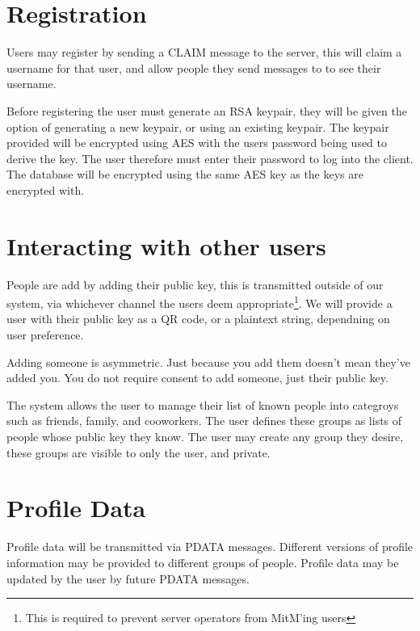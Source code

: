
\section{Registration}
Users may register by sending a CLAIM message to the server, this will claim a
username for that user, and allow people they send messages to to see their
username.

Before registering the user must generate an RSA keypair, they will be given the
option of generating a new keypair, or using an existing keypair. The keypair
provided will be encrypted using AES with the users password being used to
derive the key. The user therefore must enter their password to log into the
client. The database will be encrypted using the same AES key as the keys are
encrypted with.

\section{Interacting with other users}
People are add by adding their public key, this is transmitted outside of our
system, via whichever channel the users deem appropriate\footnote{This is
required to prevent server operators from MitM'ing users}. We will provide a
user with their public key as a QR code, or a plaintext string, dependning on
user preference.

Adding someone is asymmetric. Just because you add them doesn't mean they've
added you. You do not require consent to add someone, just their public key.
    
The system allows the user to manage their list of known people into categroys
such as friends, family, and cooworkers. The user defines these groups as lists
of people whose public key they know. The user may create any group they desire,
these groups are visible to only the user, and private.

\section{Profile Data}
Profile data will be transmitted via PDATA messages. Different versions of
profile information may be provided to different groups of people. Profile data
may be updated by the user by future PDATA messages.

